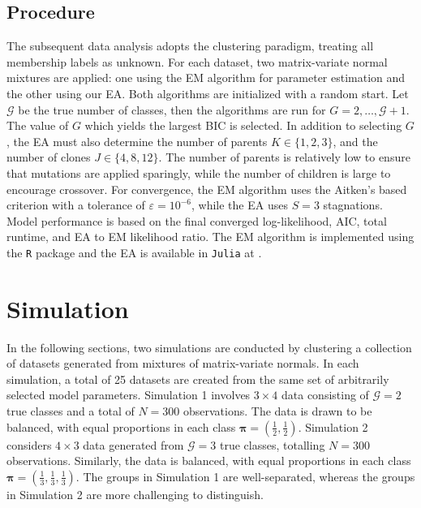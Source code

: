 \documentclass[12pt]{report}
\begin{document}
\section{Procedure}
The subsequent data analysis adopts the clustering paradigm, treating all membership labels as unknown. For each dataset, two matrix-variate normal mixtures are applied: one using the EM algorithm for parameter estimation and the other using our EA. Both algorithms are initialized with a random start. Let $\mathcal{G}$ be the true number of classes, then the algorithms are run for $G=2,\dots, \mathcal{G} + 1$. The value of $G$ which yields the largest BIC is selected. In addition to selecting $G$, the EA must also determine the number of parents $K \in \{1, 2, 3\}$, and the number of clones $J \in \{4, 8, 12\}$. The number of parents is relatively low to ensure that mutations are applied sparingly, while the number of children is large to encourage crossover. For convergence, the EM algorithm uses the Aitken's based criterion with a tolerance of $\varepsilon =10^{-6}$, while the EA uses $S=3$ stagnations. Model performance is based on the final converged log-likelihood, AIC, total runtime, and EA to EM likelihood ratio. The EM algorithm is implemented using the \texttt{R} package \citet{matrixmixtures} and the EA is available in \texttt{Julia} at \citet{flynn2023} \citep{R, Julia}.






\chapter{Simulation}
In the following sections, two simulations are conducted by clustering a collection of datasets generated from mixtures of matrix-variate normals. In each simulation, a total of 25 datasets are created from the same set of arbitrarily selected model parameters. Simulation 1 involves $3 \times 4$ data consisting of $\mathcal{G}=2$ true classes and a total of $N=300$ observations. The data is drawn to be balanced, with equal proportions in each class $\bm{\pi} = (\frac{1}{2}, \frac{1}{2})$. Simulation 2 considers $4 \times 3$ data generated from $\mathcal{G} = 3$ true classes, totalling $N= 300$ observations. Similarly, the data is balanced, with equal proportions in each class $\bm{\pi} = (\frac{1}{3}, \frac{1}{3}, \frac{1}{3})$. The groups in Simulation 1 are well-separated, whereas the groups in Simulation 2 are more challenging to distinguish. 
\end{document}
